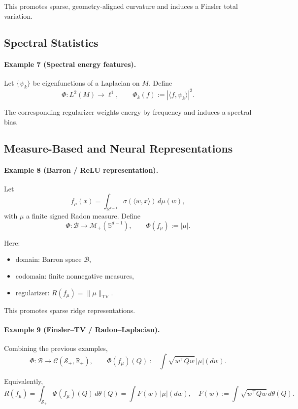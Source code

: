 This promotes sparse, geometry-aligned curvature and induces a Finsler total variation.

\subsection{Spectral Statistics}

\paragraph{Example 7 (Spectral energy features).}
Let $\{\psi_k\}$ be eigenfunctions of a Laplacian on $M$.
Define
\[
	\Phi : L^2(M) \to \ell^1,
	\qquad
	\Phi_k(f) := |\langle f,\psi_k\rangle|^2.
\]

The corresponding regularizer weights energy by frequency and induces a spectral bias.


\subsection{Measure-Based and Neural Representations}

\paragraph{Example 8 (Barron / ReLU representation).}
Let
\[
	f_\mu(x) = \int_{\mathbb S^{d-1}} \sigma(\langle w,x\rangle)\, d\mu(w),
\]
with $\mu$ a finite signed Radon measure.
Define
\[
	\Phi : \mathcal B \to \mathcal M_+(\mathbb S^{d-1}),
	\qquad
	\Phi(f_\mu) := |\mu|.
\]

Here:
\begin{itemize}
	\item domain: Barron space $\mathcal B$,
	\item codomain: finite nonnegative measures,
	\item regularizer: $R(f_\mu)=\|\mu\|_{\mathrm{TV}}$.
\end{itemize}

This promotes sparse ridge representations.


\paragraph{Example 9 (Finsler--TV / Radon--Laplacian).}
Combining the previous examples,
\[
	\Phi : \mathcal B \to \mathcal C(\mathcal S_+,\mathbb{R}_+),
	\qquad
	\Phi(f_\mu)(Q) := \int \sqrt{w^\top Q w}\,|\mu|(dw).
\]

Equivalently,
\[
	R(f_\mu)
	=
	\int_{\mathcal S_+} \Phi(f_\mu)(Q)\, d\theta(Q)
	=
	\int F(w)\,|\mu|(dw),
	\quad
	F(w):=\int \sqrt{w^\top Q w}\, d\theta(Q).
\]

